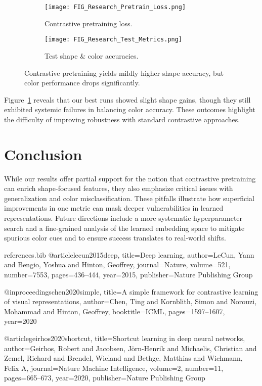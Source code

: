 \documentclass{article}
\begin{document}
\begin{figure}[t]
\centering
\begin{subfigure}{0.49\linewidth}
\texttt{[image: FIG\_Research\_Pretrain\_Loss.png]}
\caption{Contrastive pretraining loss.}
\end{subfigure}
\hfill
\begin{subfigure}{0.49\linewidth}
\texttt{[image: FIG\_Research\_Test\_Metrics.png]}
\caption{Test shape \& color accuracies.}
\end{subfigure}
\caption{Contrastive pretraining yields mildly higher shape accuracy, but color performance drops significantly.}
\label{fig:research}
\end{figure}

Figure~\ref{fig:research} reveals that our best runs showed slight shape gains, though they still exhibited systemic failures in balancing color accuracy. These outcomes highlight the difficulty of improving robustness with standard contrastive approaches.

\section{Conclusion}
While our results offer partial support for the notion that contrastive pretraining can enrich shape-focused features, they also emphasize critical issues with generalization and color misclassification. These pitfalls illustrate how superficial improvements in one metric can mask deeper vulnerabilities in learned representations. Future directions include a more systematic hyperparameter search and a fine-grained analysis of the learned embedding space to mitigate spurious color cues and to ensure success translates to real-world shifts.

\clearpage
\begin{filecontents}{references.bib}
@article{lecun2015deep,
  title={Deep learning},
  author={LeCun, Yann and Bengio, Yoshua and Hinton, Geoffrey},
  journal={Nature},
  volume={521},
  number={7553},
  pages={436--444},
  year={2015},
  publisher={Nature Publishing Group}
}

@inproceedings{chen2020simple,
  title={A simple framework for contrastive learning of visual representations},
  author={Chen, Ting and Kornblith, Simon and Norouzi, Mohammad and Hinton, Geoffrey},
  booktitle={ICML},
  pages={1597--1607},
  year={2020}
}

@article{geirhos2020shortcut,
  title={Shortcut learning in deep neural networks},
  author={Geirhos, Robert and Jacobsen, J{\"o}rn-Henrik and Michaelis, Christian and Zemel, Richard and Brendel, Wieland and Bethge, Matthias and Wichmann, Felix A},
  journal={Nature Machine Intelligence},
  volume={2},
  number={11},
  pages={665--673},
  year={2020},
  publisher={Nature Publishing Group}
}
\end{filecontents}
\end{document}
